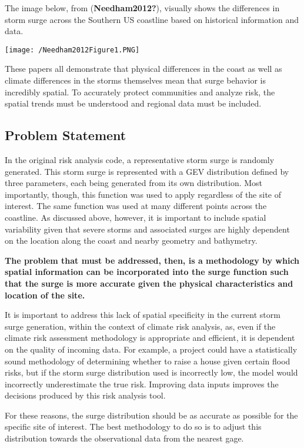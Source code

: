 \documentclass[
  11pt,
]{article}
\begin{document}
The image below, from (\textbf{Needham2012?}), visually shows the
differences in storm surge across the Southern US coastline based on
historical information and data.

\texttt{[image: /Needham2012Figure1.PNG]}

These papers all demonstrate that physical differences in the coast as
well as climate differences in the storms themselves mean that surge
behavior is incredibly spatial. To accurately protect communities and
analyze risk, the spatial trends must be understood and regional data
must be included.

\hypertarget{problem-statement}{%
\subsection{Problem Statement}\label{problem-statement}}

In the original risk analysis code, a representative storm surge is
randomly generated. This storm surge is represented with a GEV
distribution defined by three parameters, each being generated from its
own distribution. Most importantly, though, this function was used to
apply regardless of the site of interest. The same function was used at
many different points across the coastline. As discussed above, however,
it is important to include spatial variability given that severe storms
and associated surges are highly dependent on the location along the
coast and nearby geometry and bathymetry.

\textbf{The problem that must be addressed, then, is a methodology by
which spatial information can be incorporated into the surge function
such that the surge is more accurate given the physical characteristics
and location of the site.}

It is important to address this lack of spatial specificity in the
current storm surge generation, within the context of climate risk
analysis, as, even if the climate risk assessment methodology is
appropriate and efficient, it is dependent on the quality of incoming
data. For example, a project could have a statistically sound
methodology of determining whether to raise a house given certain flood
risks, but if the storm surge distribution used is incorrectly low, the
model would incorrectly underestimate the true risk. Improving data
inputs improves the decisions produced by this risk analysis tool.

For these reasons, the surge distribution should be as accurate as
possible for the specific site of interest. The best methodology to do
so is to adjust this distribution towards the observational data from
the nearest gage.
\end{document}
